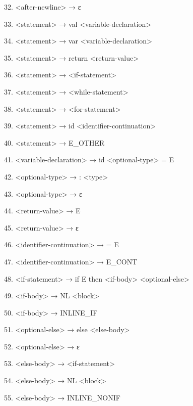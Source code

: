 \documentclass{article}
\begin{document}
32. \textless after-newline\textgreater{} → ε

33. \textless statement\textgreater{} → val \textless variable-declaration\textgreater{}

34. \textless statement\textgreater{} → var \textless variable-declaration\textgreater{}

35. \textless statement\textgreater{} → return \textless return-value\textgreater{}

36. \textless statement\textgreater{} → \textless if-statement\textgreater{}

37. \textless statement\textgreater{} → \textless while-statement\textgreater{}

38. \textless statement\textgreater{} → \textless for-statement\textgreater{}

39. \textless statement\textgreater{} → id \textless identifier-continuation\textgreater{}

40. \textless statement\textgreater{} → E\_OTHER

41. \textless variable-declaration\textgreater{} → id \textless optional-type\textgreater{} = E

42. \textless optional-type\textgreater{} → : \textless type\textgreater{}

43. \textless optional-type\textgreater{} → ε

44. \textless return-value\textgreater{} → E

45. \textless return-value\textgreater{} → ε

46. \textless identifier-continuation\textgreater{} → = E

47. \textless identifier-continuation\textgreater{} → E\_CONT

48. \textless if-statement\textgreater{} → if E then \textless if-body\textgreater{} \textless optional-else\textgreater{}

49. \textless if-body\textgreater{} → NL \textless block\textgreater{}

50. \textless if-body\textgreater{} → INLINE\_IF

51. \textless optional-else\textgreater{} → else \textless else-body\textgreater{}

52. \textless optional-else\textgreater{} → ε

53. \textless else-body\textgreater{} → \textless if-statement\textgreater{}

54. \textless else-body\textgreater{} → NL \textless block\textgreater{}

55. \textless else-body\textgreater{} → INLINE\_NONIF
\end{document}
